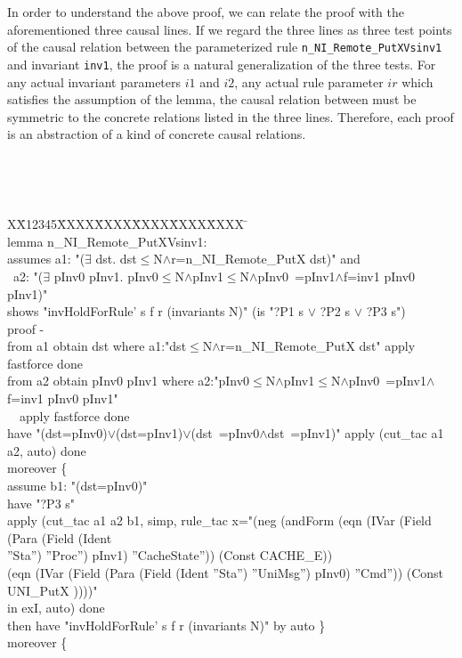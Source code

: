 \documentclass{llncs}
\newlength{\fminilength}
\newenvironment{fmini}[1][\linewidth]
  {\setlength{\fminilength}{#1\fboxsep-2\fboxrule}%
   \vspace{2ex}\noindent\begin{lrbox}{\fminibox}\begin{minipage}{\fminilength}%
   \mbox{ }\hfill\vspace{-2.5ex}}%
  {\end{minipage}\end{lrbox}\vspace{1ex}\hspace{0ex}%
   \framebox{\usebox{\fminibox}}}
\newenvironment{specification}
{\noindent\scriptsize
\tt\begin{fmini}\begin{tabbing}X\=X12345\=XXXX\=XXXX\=XXXX\=XXXX\=XXXX
\=\+\kill} {\end{tabbing}\normalfont\end{fmini}}
\def \twoSpaces {\ \ }
\def \twoSpaces {\ \ }
\begin{document}
In order to understand the above proof, we can relate the proof with the aforementioned three causal lines.  If we regard the three lines  as  three test points of the causal relation between the parameterized rule {\tt  n\_NI\_Remote\_PutXVsinv1} and invariant {\tt inv1}, the proof is a natural generalization of the three tests. For any actual invariant parameters $i1$ and $i2$, any actual rule parameter $ir$ which satisfies the assumption of the lemma, the causal relation between  must be symmetric to the concrete relations listed in the three lines. Therefore, each proof is an abstraction of a kind of concrete causal relations.

\begin{specification}\\
lemma n\_NI\_Remote\_PutXVsinv1:\\
assumes a1: "($\exists$ dst. dst$\le$N$\wedge$r=n\_NI\_Remote\_PutX  dst)" and\\\
a2: "($\exists$ pInv0 pInv1. pInv0$\le$N$\wedge$pInv1$\le$N$\wedge$pInv0~=pInv1$\wedge$f=inv1  pInv0 pInv1)"\\
shows "invHoldForRule' s f r (invariants N)" (is "?P1 s $\vee$ ?P2 s $\vee$ ?P3 s")\\
proof -\\
from a1 obtain dst where a1:"dst$\le$N$\wedge$r=n\_NI\_Remote\_PutX  dst" apply fastforce done\\
from a2 obtain pInv0 pInv1 where a2:"pInv0$\le$N$\wedge$pInv1$\le$N$\wedge$pInv0~=pInv1$\wedge$f=inv1  pInv0 pInv1" \\
\twoSpaces apply fastforce done\\
have "(dst=pInv0)$\vee$(dst=pInv1)$\vee$(dst~=pInv0$\wedge$dst~=pInv1)" apply (cut\_tac a1 a2, auto) done\\
moreover \{\\
  assume b1: "(dst=pInv0)"\\
  have "?P3 s"\\
  apply (cut\_tac a1 a2 b1, simp, rule\_tac x="(neg (andForm (eqn (IVar (Field (Para (Field (Ident \\
  ''Sta'') ''Proc'') pInv1) ''CacheState'')) (Const CACHE\_E))\\
  (eqn (IVar (Field (Para (Field (Ident ''Sta'') ''UniMsg'') pInv0) ''Cmd'')) (Const UNI\_PutX  ))))"\\ in exI, auto) done\\
  then have "invHoldForRule' s f r (invariants N)" by auto
\}\\
moreover \{\\

\end{specification}
\end{document}
